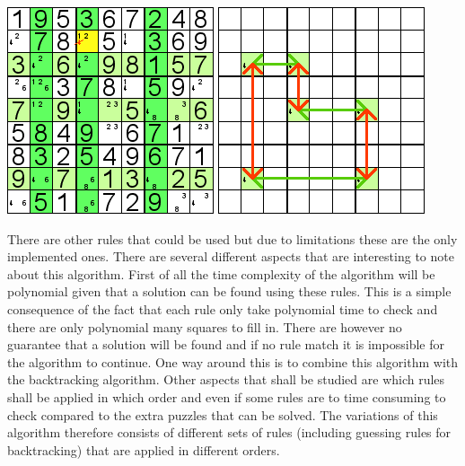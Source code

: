 \documentclass[a4paper,11pt]{kth-mag}
\begin{document}
\begin{description}
\includegraphics{images/swordfish1.png}
\newline
\includegraphics{images/swordfish2.png}

\end{description}

There are other rules that could be used but due to limitations these are the only implemented ones. There are several different aspects that are interesting to note about this algorithm. First of all the time complexity of the algorithm will be polynomial given that a solution can be found using these rules. This is a simple consequence of the fact that each rule only take polynomial time to check and there are only polynomial many squares to fill in. There are however no guarantee that a solution will be found and if no rule match it is impossible for the algorithm to continue. One way around this is to combine this algorithm with the backtracking algorithm. Other aspects that shall be studied are which rules shall be applied in which order and even if some rules are to time consuming to check compared to the extra puzzles that can be solved. The variations of this algorithm therefore consists of different sets of rules (including guessing rules for backtracking) that are applied in different orders. 
\end{document}
